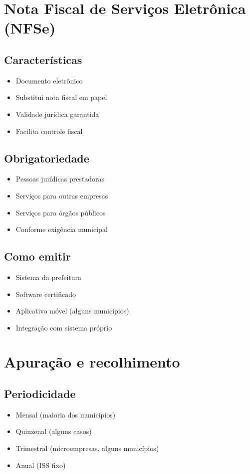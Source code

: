 \documentclass[12pt,a4paper]{article}
\begin{document}
\section{Nota Fiscal de Serviços Eletrônica (NFSe)}

\subsection{Características}
\begin{itemize}
    \item Documento eletrônico
    \item Substitui nota fiscal em papel
    \item Validade jurídica garantida
    \item Facilita controle fiscal
\end{itemize}

\subsection{Obrigatoriedade}
\begin{itemize}
    \item Pessoas jurídicas prestadoras
    \item Serviços para outras empresas
    \item Serviços para órgãos públicos
    \item Conforme exigência municipal
\end{itemize}

\subsection{Como emitir}
\begin{itemize}
    \item Sistema da prefeitura
    \item Software certificado
    \item Aplicativo móvel (alguns municípios)
    \item Integração com sistema próprio
\end{itemize}

\section{Apuração e recolhimento}

\subsection{Periodicidade}
\begin{itemize}
    \item Mensal (maioria dos municípios)
    \item Quinzenal (alguns casos)
    \item Trimestral (microempresas, alguns municípios)
    \item Anual (ISS fixo)
\end{itemize}
\end{document}
